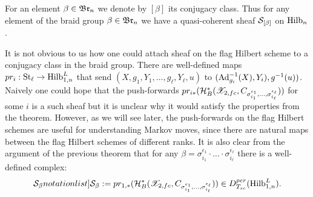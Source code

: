 For an element $\beta\in \mathfrak{Br}_n$ we denote by $[\beta]$ its conjugacy class.
Thus for any element of the braid group $\beta\in \mathfrak{Br}_n$ we have a quasi-coherent sheaf $\mathcal{S}_{[\beta]}$
on $\mathrm{Hilb}_n$.

It is not obvious to us how one could attach sheaf on the flag Hilbert scheme to a conjugacy class in the braid group. There are well-defined maps
\(pr_i:\mathrm{St}_\ell\rightarrow \mathrm{Hilb}_{1,n}^L\) that send \((X,g_1,Y_1,\dots,g_\ell,Y_\ell,u)\) to \(({\rm Ad}_{g_i}^{-1}(X),Y_i),g^{-1}(u))\).
Naively one could hope that
 the push-forwards $pr_{i*}(\mathcal{H}^*_B(\mathscr{X}_{2,fc},C_{\sigma_{i_1}^{\epsilon_1},\dots,\sigma_{i_\ell}^{\epsilon_\ell}}))$  for some $i$ is a such sheaf
   but it is unclear why it would satisfy the properties from the
theorem.  However, as we will see later, the push-forwards on the flag Hilbert schemes are useful for understanding Markov moves, since there are natural maps between the
flag Hilbert schemes of different ranks. It is also clear from the argument of the previous theorem
that for any $\beta=\sigma_{i_1}^{\epsilon_1}\cdot\dots\cdot\sigma_{i_\ell}^{\epsilon_\ell}$ there is a well-defined complex:
$$\SymbolPrint{\mathcal{S}_\beta}:=pr_{1,*}(\calH^*_B(\calX_{2,fc},C_{\sigma_{i_1}^{\epsilon_1},\dots,\sigma_{i_\ell}^{\epsilon_\ell}}))\in D^{per}_{T_{sc}}(\Hilb_{1,n}^L).$$
















